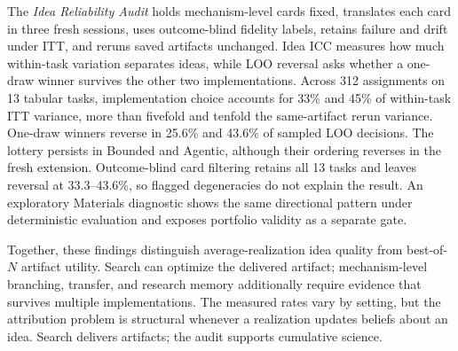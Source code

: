 \documentclass[letterpaper]{article}
\begin{document}
The \emph{Idea Reliability Audit} holds mechanism-level cards fixed, translates each card in three fresh sessions, uses outcome-blind fidelity labels, retains failure and drift under ITT, and reruns saved artifacts unchanged. Idea ICC measures how much within-task variation separates ideas, while LOO reversal asks whether a one-draw winner survives the other two implementations. Across 312 assignments on 13 tabular tasks, implementation choice accounts for 33\% and 45\% of within-task ITT variance, more than fivefold and tenfold the same-artifact rerun variance. One-draw winners reverse in 25.6\% and 43.6\% of sampled LOO decisions. The lottery persists in Bounded and Agentic, although their ordering reverses in the fresh extension. Outcome-blind card filtering retains all 13 tasks and leaves reversal at 33.3--43.6\%, so flagged degeneracies do not explain the result. An exploratory Materials diagnostic shows the same directional pattern under deterministic evaluation and exposes portfolio validity as a separate gate.

Together, these findings distinguish average-realization idea quality from best-of-$N$ artifact utility. Search can optimize the delivered artifact; mechanism-level branching, transfer, and research memory additionally require evidence that survives multiple implementations. The measured rates vary by setting, but the attribution problem is structural whenever a realization updates beliefs about an idea. Search delivers artifacts; the audit supports cumulative science.

\clearpage

\end{document}
